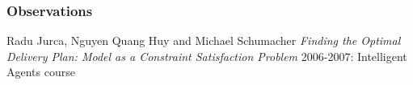 \documentclass[11pt]{article}
\begin{document}
\subsubsection{Observations}



\begin{thebibliography}{1}

 Radu Jurca, Nguyen Quang Huy and Michael
Schumacher {\em Finding the Optimal Delivery Plan: Model as a
Constraint Satisfaction Problem} 2006-2007: Intelligent Agents course
\end{thebibliography}
\end{document}
